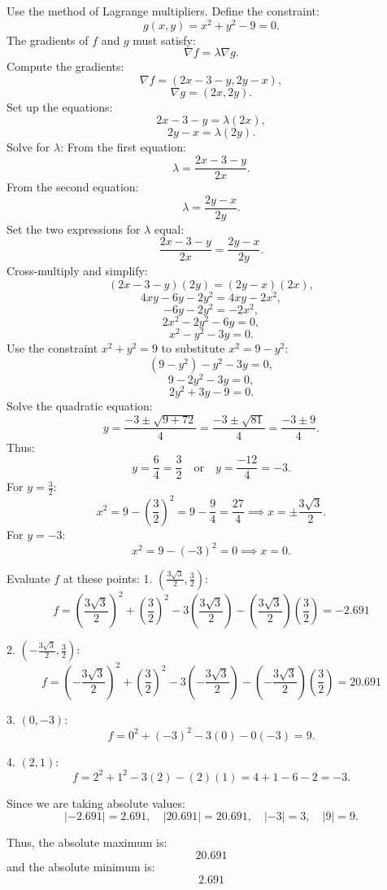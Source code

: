 \documentclass[11pt]{exam}
\begin{document}
\begin{questions}
\begin{parts}
Use the method of Lagrange multipliers. Define the constraint:
\[
g(x, y) = x^2 + y^2 - 9 = 0.
\]
The gradients of \( f \) and \( g \) must satisfy:
\[
\nabla f = \lambda \nabla g.
\]
Compute the gradients:
\[
\nabla f = (2x - 3 - y, 2y - x),
\]
\[
\nabla g = (2x, 2y).
\]
Set up the equations:
\[
2x - 3 - y = \lambda (2x),
\]
\[
2y - x = \lambda (2y).
\]
Solve for \( \lambda \):
From the first equation:
\[
\lambda = \frac{2x - 3 - y}{2x}.
\]
From the second equation:
\[
\lambda = \frac{2y - x}{2y}.
\]
Set the two expressions for \( \lambda \) equal:
\[
\frac{2x - 3 - y}{2x} = \frac{2y - x}{2y}.
\]
Cross-multiply and simplify:
\[
(2x - 3 - y)(2y) = (2y - x)(2x),
\]
\[
4xy - 6y - 2y^2 = 4xy - 2x^2,
\]
\[
-6y - 2y^2 = -2x^2,
\]
\[
2x^2 - 2y^2 - 6y = 0,
\]
\[
x^2 - y^2 - 3y = 0.
\]
Use the constraint \( x^2 + y^2 = 9 \) to substitute \( x^2 = 9 - y^2 \):
\[
(9 - y^2) - y^2 - 3y = 0,
\]
\[
9 - 2y^2 - 3y = 0,
\]
\[
2y^2 + 3y - 9 = 0.
\]
Solve the quadratic equation:
\[
y = \frac{-3 \pm \sqrt{9 + 72}}{4} = \frac{-3 \pm \sqrt{81}}{4} = \frac{-3 \pm 9}{4}.
\]
Thus:
\[
y = \frac{6}{4} = \frac{3}{2} \quad \text{or} \quad y = \frac{-12}{4} = -3.
\]
For \( y = \frac{3}{2} \):
\[
x^2 = 9 - \left(\frac{3}{2}\right)^2 = 9 - \frac{9}{4} = \frac{27}{4} \implies x = \pm \frac{3\sqrt{3}}{2}.
\]
For \( y = -3 \):
\[
x^2 = 9 - (-3)^2 = 0 \implies x = 0.
\]

Evaluate \( f \) at these points:
1. \( \left(\frac{3\sqrt{3}}{2}, \frac{3}{2}\right) \):
   \[
   f = \left(\frac{3\sqrt{3}}{2}\right)^2 + \left(\frac{3}{2}\right)^2 - 3\left(\frac{3\sqrt{3}}{2}\right) - \left(\frac{3\sqrt{3}}{2}\right)\left(\frac{3}{2}\right) = -2.691
   \]

2. \( \left(-\frac{3\sqrt{3}}{2}, \frac{3}{2}\right) \):
   \[
   f = \left(-\frac{3\sqrt{3}}{2}\right)^2 + \left(\frac{3}{2}\right)^2 - 3\left(-\frac{3\sqrt{3}}{2}\right) - \left(-\frac{3\sqrt{3}}{2}\right)\left(\frac{3}{2}\right) = 20.691
   \]

3. \( (0, -3) \):
   \[
   f = 0^2 + (-3)^2 - 3(0) - 0(-3) = 9.
   \]

4. \( (2,1) \):
   \[
   f = 2^2 + 1^2 - 3(2) - (2)(1) = 4 + 1 - 6 - 2 = -3.
   \]

Since we are taking absolute values:
\[
| -2.691 | = 2.691, \quad | 20.691 | = 20.691, \quad | -3 | = 3, \quad | 9 | = 9.
\]

Thus, the absolute maximum is:
\[
20.691
\]
and the absolute minimum is:
\[
2.691
\]

\end{parts}





\end{questions}
\end{document}
